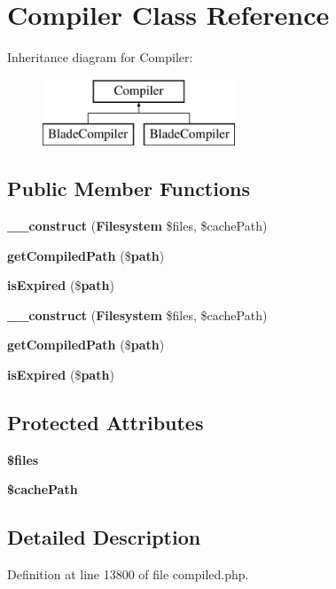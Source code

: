 \section{Compiler Class Reference}
\label{class_illuminate_1_1_view_1_1_compilers_1_1_compiler}
Inheritance diagram for Compiler\+:\begin{figure}[H]
\begin{center}
\leavevmode
\includegraphics[height=2.000000cm]{class_illuminate_1_1_view_1_1_compilers_1_1_compiler}
\end{center}
\end{figure}
\subsection*{Public Member Functions}
\begin{DoxyCompactItemize}
\item 
{\bf \+\_\+\+\_\+construct} ({\bf Filesystem} \$files, \$cache\+Path)
\item 
{\bf get\+Compiled\+Path} (\${\bf path})
\item 
{\bf is\+Expired} (\${\bf path})
\item 
{\bf \+\_\+\+\_\+construct} ({\bf Filesystem} \$files, \$cache\+Path)
\item 
{\bf get\+Compiled\+Path} (\${\bf path})
\item 
{\bf is\+Expired} (\${\bf path})
\end{DoxyCompactItemize}
\subsection*{Protected Attributes}
\begin{DoxyCompactItemize}
\item 
{\bf \$files}
\item 
{\bf \$cache\+Path}
\end{DoxyCompactItemize}


\subsection{Detailed Description}


Definition at line 13800 of file compiled.\+php.



